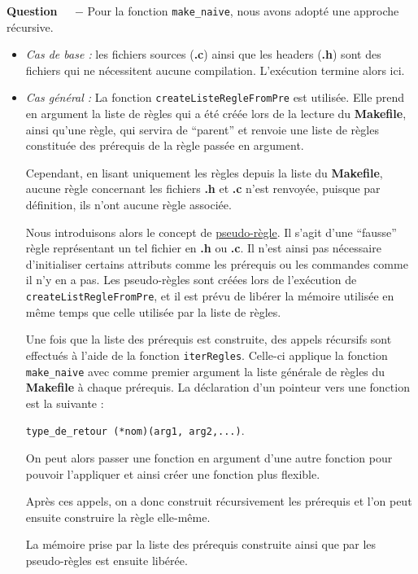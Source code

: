 \documentclass[11pt]{article}
\newcounter{question}[section]
\newenvironment{question}[1][]{\refstepcounter{question}\par\medskip
   \noindent\textbf{Question~\thequestion ~ $-$} \rmfamily}{}
\begin{document}
\begin{question} %
Pour la fonction \texttt{make\_naive}, nous avons adopté une approche récursive.
\begin{itemize}
	\item \emph{Cas de base :} les fichiers sources (\textbf{.c}) ainsi que les headers (\textbf{.h}) sont des fichiers qui ne nécessitent aucune compilation.
	L'exécution termine alors ici.
	\item \emph{Cas général :} La fonction \texttt{createListeRegleFromPre} est utilisée. Elle prend en argument la liste de règles qui a été créée lors de la lecture du \textbf{Makefile}, ainsi qu'une règle, qui servira de ``parent''
	et renvoie une liste de règles constituée des prérequis de la règle passée en argument.

	Cependant, en lisant uniquement les règles depuis la liste du \textbf{Makefile}, aucune règle concernant les fichiers \textbf{.h} et \textbf{.c} n'est renvoyée, puisque par définition, ils n'ont aucune règle associée.

	Nous introduisons alors le concept de \underline{pseudo-règle}. Il s'agit d'une ``fausse'' règle représentant un tel fichier en \textbf{.h} ou \textbf{.c}. Il n'est ainsi pas nécessaire d'initialiser certains attributs comme les prérequis ou les commandes comme il n'y en a pas.
	Les pseudo-règles sont créées lors de l'exécution de \texttt{createListRegleFromPre}, et il est prévu de libérer la mémoire utilisée en même temps que celle utilisée par la liste de règles.

	Une fois que la liste des prérequis est construite, des appels récursifs sont effectués à l'aide de la fonction \texttt{iterRegles}. Celle-ci applique la fonction \texttt{make\_naive} avec comme premier argument la liste générale de règles du \textbf{Makefile} à chaque prérequis.
	La déclaration d'un pointeur vers une fonction est la suivante \cite{functionPointers} : 
	\begin{center}
		\texttt{type\_de\_retour  (*nom)(arg1, arg2,...)}. 
	\end{center}
	On peut alors passer une fonction en argument d'une autre fonction pour pouvoir l'appliquer et ainsi créer une fonction plus flexible. 

	Après ces appels, on a donc construit récursivement les prérequis et l'on peut ensuite construire la règle elle-même.
	
	La mémoire prise par la liste des prérequis construite ainsi que par les pseudo-règles est ensuite libérée.
\end{itemize}
\end{question}
\end{document}
